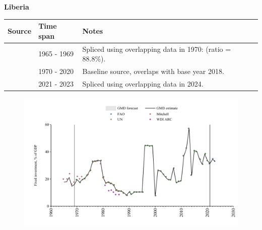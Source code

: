 \documentclass[12pt,a4paper,landscape]{article}
\begin{document}
\begin{adjustbox}{max totalsize={\paperwidth}{\paperheight},center}
\begin{minipage}[t][\textheight][t]{\textwidth}
\vspace*{0.5cm}
{}
\begin{center}
{\Large\bfseries Liberia}
\end{center}
\vspace{0.5cm}
\begin{table}[H]
\centering
\small
\begin{tabular}{|l|l|l|}
\hline
\textbf{Source} & \textbf{Time span} & \textbf{Notes} \\
\hline
\rowcolor{white}\cite{Mitchell}& 1965 - 1969 &Spliced using overlapping data in 1970: (ratio = 88.8\%).\\
\rowcolor{lightgray}\cite{UN}& 1970 - 2020 &Baseline source, overlaps with base year 2018.\\
\rowcolor{white}\cite{FAO}& 2021 - 2023 &Spliced using overlapping data in 2024.\\
\hline
\end{tabular}
\end{table}
\begin{figure}[H]
\centering
\includegraphics[width=\textwidth,height=0.6\textheight,keepaspectratio]{graphs/LBR_finv_GDP.pdf}
\end{figure}
\end{minipage}
\end{adjustbox}
\end{document}
